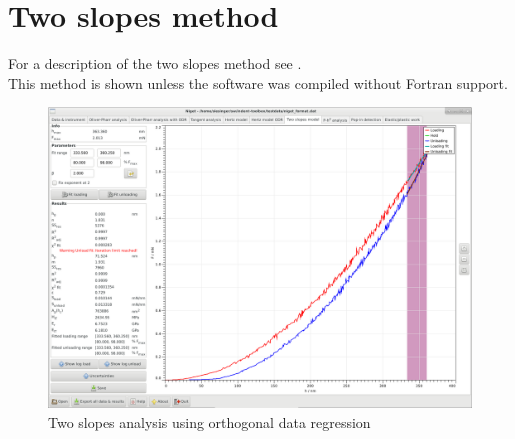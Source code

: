 \section{Two slopes method}
For a description of the two slopes method see \cite{Oliver}. \\ 
This method is shown unless the software was compiled without Fortran support.  \\

\begin{figure}[ht]
  \centering
  \includegraphics[width=\textwidth]{images/screen-twoslopes}
  \caption{Two slopes analysis using orthogonal data regression}
\end{figure}

